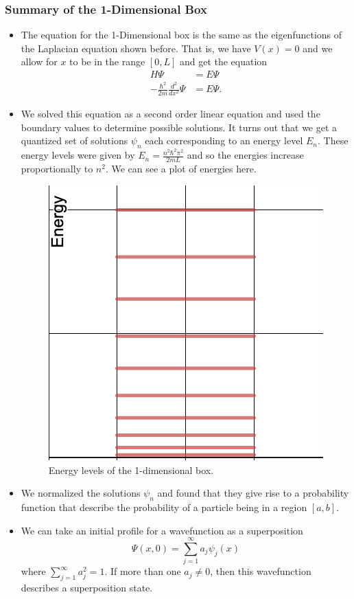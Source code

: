 \subsubsection{Summary of the 1-Dimensional Box}
\begin{itemize}
    \item The equation for the 1-Dimensional box is the same as the eigenfunctions of the Laplacian equation shown before. That is, we have $V(x)=0$ and we allow for $x$ to be in the range $[0,L]$ and get the equation
    \begin{align*}
        H\Psi &= E \Psi\\
        -\frac{\hbar^2}{2m}\frac{d^2}{dx^2}\Psi &= E \Psi.
    \end{align*}
    \item We solved this equation as a second order linear equation and used the boundary values to determine possible solutions.  It turns out that we get a quantized set of solutions $\psi_n$ each corresponding to an energy level $E_n$. These energy levels were given by $E_n = \frac{n^2 \hbar^2 \pi^2}{2mL}$ and so the energies increase proportionally to $n^2$. We can see a plot of energies here.
    \begin{figure}[H]
        \centering
        \includegraphics[width=.5\textwidth]{Figures_Part_2/energy_levels.png}
        \caption{Energy levels of the 1-dimensional box.}
    \end{figure}
    \item We normalized the solutions $\psi_n$ and found that they give rise to a probability function that describe the probability of a particle being in a region $[a,b]$. 
    \item We can take an initial profile for a wavefunction as a superposition
    \[
    \Psi(x,0)=\sum_{j=1}^\infty a_j \psi_j(x)
    \]
    where $\sum_{j=1}^\infty a_j^2 = 1$. If more than one $a_j\neq 0$, then this wavefunction describes a superposition state. 

\end{itemize}
